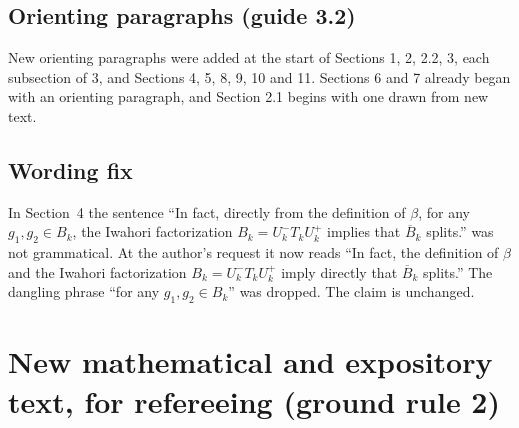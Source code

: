 \documentclass[12pt,letterpaper]{amsart}
\begin{document}
\subsection{Orienting paragraphs (guide 3.2)}
New orienting paragraphs were added at the start of Sections 1, 2, 2.2, 3,
each subsection of 3, and Sections 4, 5, 8, 9, 10 and 11. Sections 6 and 7
already began with an orienting paragraph, and Section 2.1 begins with one
drawn from new text.

\subsection{Wording fix}
In Section~4 the sentence ``In fact, directly from the definition of $\beta$,
for any $g_1,g_2\in B_k$, the Iwahori factorization $B_k=U_k^-T_kU_k^+$
implies that $\overline{B}_k$ splits.'' was not grammatical. At the author's
request it now reads ``In fact, the definition of $\beta$ and the Iwahori
factorization $B_k=U_k^-T_kU_k^+$ imply directly that $\overline{B}_k$
splits.'' The dangling phrase ``for any $g_1,g_2\in B_k$'' was dropped. The
claim is unchanged.

\section{New mathematical and expository text, for refereeing (ground rule 2)}
\end{document}
